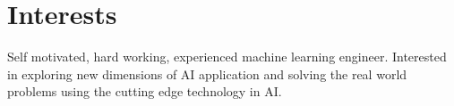 \documentclass[letterpaper]{twentysecondcv} %
\begin{document}
\makeprofile %


\vspace{-0.2cm}
\section{Interests}
\vspace{-0.2cm}
	{Self motivated, hard working, experienced machine learning engineer. Interested in exploring new dimensions of AI application and solving the real world problems using the cutting edge technology in AI.}
 \vspace{-0.2cm}
 \vspace{-0.2cm}
\end{document}
